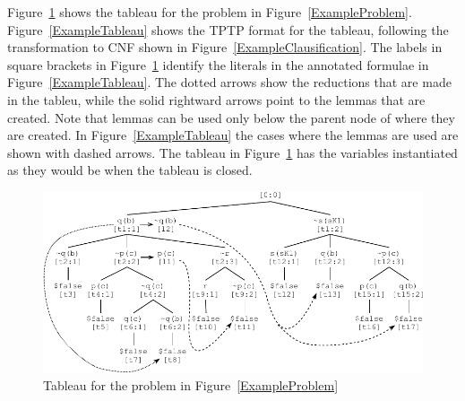 \documentclass[runningheads]{llncs}
\begin{document}
Figure~\ref{TableauPicture} shows the tableau for the problem in Figure~\ref{ExampleProblem}.
Figure~\ref{ExampleTableau} shows the TPTP format for the tableau, following the transformation
to CNF shown in Figure~\ref{ExampleClausification}.
The labels in square brackets in Figure~\ref{TableauPicture} identify the literals in the 
annotated formulae in Figure~\ref{ExampleTableau}.
The dotted arrows show the reductions that are made in the tableu, while the solid rightward arrows point to the lemmas that are created. 
Note that lemmas can be used only below the parent node of where they are created. 
In Figure~\ref{ExampleTableau} the cases where the lemmas are used are shown with dashed arrows.
The tableau in Figure~\ref{TableauPicture} has the variables instantiated as they would be when 
the tableau is closed.

\begin{figure}[htb]
\centering
\includegraphics[width=1.0\textwidth]{Tableau.pdf}
\vspace*{-1em}
\caption{Tableau for the problem in Figure~\ref{ExampleProblem}}
\label{TableauPicture}
\end{figure}
\end{document}
